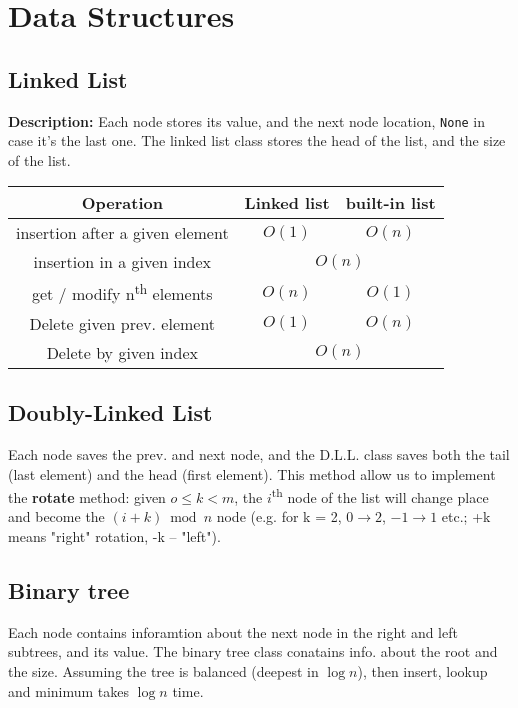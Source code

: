 \documentclass[]{article}
\newcommand\ts    {\textsuperscript}
\newcommand\fortitle[1] {\Large #1 \normalsize}
\begin{document}
	
	\section{\fortitle{Data Structures}}
	\begin{multicols}{2}
		
		\subsection{Linked List}
		\textbf{Description: }Each node stores its value, and the next node location, \texttt{None} in case it's the last one. The linked list class stores the head of the list, and the size of the list. 
		\begin{center}
			\begin{tabular}{|c|c|c|} 
				\hline Operation & Linked list & built-in list \\ 
				\hline insertion after a given element & $ O(1) $ & \color{deepred}$ O(n) $ \\
				\hline insertion in a given index & \multicolumn{2}{c|}{$ O(n) $} \\
				\hline get / modify n\ts{th} elements & \color{deepred}$ O(n) $ & $ O(1) $ \\
				\hline Delete given prev. element & $ O(1) $ & \color{deepred}$ O(n) $ \\
				\hline Delete by given index & \multicolumn{2}{c|}{\color{deepred}$ O(n) $} \\
				\hline
			\end{tabular}
		\end{center}
		
		\subsection{Doubly-Linked List}	
		Each node saves the prev. and next node, and the D.L.L. class saves both the tail (last element) and the head (first element). This method allow us to implement the \textbf{rotate} method: given $ o \le k < m $, the $ i $\ts{th} node of the list will change place and become the $ (i + k) \bmod n $ node (e.g. for k = 2, $ 0 \to 2 $, $ -1 \to 1 $ etc.; +k means "right" rotation, -k -- "left"). 
		
		\subsection{Binary tree}
		Each node contains inforamtion about the next node in the right and left subtrees, and its value. The binary tree class conatains info. about the root and the size. Assuming the tree is balanced (deepest in $ \log n $), then insert, lookup and minimum takes $ \log n $ time. 
		

\end{multicols}
\end{document}
